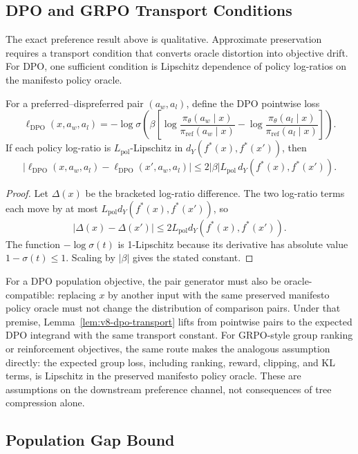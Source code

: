 \subsection{DPO and GRPO Transport Conditions}

The exact preference result above is qualitative. Approximate preservation
requires a transport condition that converts oracle distortion into objective
drift. For DPO, one sufficient condition is Lipschitz dependence of policy
log-ratios on the manifesto policy oracle.

\begin{lemma}
\label{lem:v8-dpo-transport}
For a preferred--dispreferred pair \((a_w,a_l)\), define the DPO pointwise
loss
\[
\ell_{\mathrm{DPO}}(x,a_w,a_l)
=
-\log\sigma\!\left(
\beta\left[
\log\frac{\pi_\theta(a_w\mid x)}{\pi_{\mathrm{ref}}(a_w\mid x)}
-
\log\frac{\pi_\theta(a_l\mid x)}{\pi_{\mathrm{ref}}(a_l\mid x)}
\right]\right).
\]
If each policy log-ratio is \(L_{\mathrm{pol}}\)-Lipschitz in
\(d_Y(f^\ast(x),f^\ast(x'))\), then
\[
|\ell_{\mathrm{DPO}}(x,a_w,a_l)-\ell_{\mathrm{DPO}}(x',a_w,a_l)|
\le
2|\beta|L_{\mathrm{pol}}\,
d_Y(f^\ast(x),f^\ast(x')) .
\]
\end{lemma}

\begin{proof}
Let \(\Delta(x)\) be the bracketed log-ratio difference. The two log-ratio
terms each move by at most
\(L_{\mathrm{pol}}d_Y(f^\ast(x),f^\ast(x'))\), so
\[
  |\Delta(x)-\Delta(x')|
  \le
  2L_{\mathrm{pol}}d_Y(f^\ast(x),f^\ast(x')) .
\]
The function \(-\log\sigma(t)\) is 1-Lipschitz because its derivative has
absolute value \(1-\sigma(t)\le 1\). Scaling by \(|\beta|\) gives the stated
constant.
\end{proof}

For a DPO population objective, the pair generator must also be
oracle-compatible: replacing \(x\) by another input with the same preserved
manifesto policy oracle must not change the distribution of comparison pairs.
Under that premise, Lemma~\ref{lem:v8-dpo-transport} lifts from pointwise
pairs to the expected DPO integrand with the same transport constant. For
GRPO-style group ranking or reinforcement objectives, the same route makes the analogous
assumption directly: the expected group loss, including ranking, reward,
clipping, and KL terms, is Lipschitz in the preserved manifesto policy oracle.
These are assumptions on the downstream preference channel, not consequences
of tree compression alone.

\subsection{Population Gap Bound}

